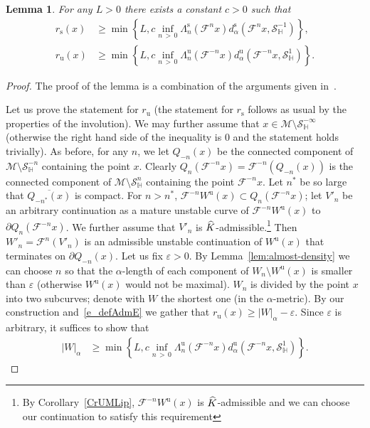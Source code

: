 \documentclass[10pt]{amsart}
\newtheorem{lemm}[theo]{Lemma}\newtheorem{prop}[theo]{Proposition}\newtheorem{coro}[theo]{Corollary}\newtheorem{conj}[theo]{Conjecture}
\theoremstyle{definition}\newtheorem{defi}[theo]{Definition}\newtheorem{rema}[theo]{Remark}\newtheorem{exam}[theo]{Example}\newtheorem{exem}[theo]{Example}\newtheorem{nota}[theo]{Notation}
\newcommand{\eps}{\varepsilon}
\newcommand{\unstable}{\text{u}}
\newcommand{\stable}{\text{s}}
\newcommand{\homo}{\mathbb{H}}
\newcommand{\cm}{\mathcal{F}}
\newcommand{\csp}{\mathcal{M}}
\newcommand{\Wu}{W^{\unstable}}
\newcommand{\dadmPrivate}{d\adm}
\newcommand{\ds}{\dadmPrivate^{\stable}}
\newcommand{\du}{\dadmPrivate^{\unstable}}
\newcommand{\rs}{r_{\stable}}
\newcommand{\ru}{r_{\unstable}}
\newcommand{\singPrivate}{\mathcal{S}}
\newcommand{\hsing}[1]{{\singPrivate}_\homo^{#1}}
\newcommand{\admiss}{admissible}
\newcommand{\adm}{_{\alpha^{+}}}
\newcommand{\admName}{\alpha^{+}}
\renewcommand{\admName}{\alpha}
\renewcommand{\adm}{_{\alpha}}
\let\oldhat\hat
\renewcommand*{\hat}[1]{\mathchoice{\widehat{#1}}{\widehat{#1}}{\oldhat{#1}}{\oldhat{#1}}}
\begin{document}
\begin{lemm} \label{PrSize}
For any $L > 0$ there exists a constant $c > 0$ such that
\begin{align*}
\rs(x)&\geq \min\left\{L,c \inf_{n\, >\,0} \Lambda_{n}^{\stable}\left(\cm^{n}x\right) \ds\left(\cm^{n}x, \hsing{-1}\right)\right\},\\
\ru(x)&\geq \min\left\{L,c \inf_{n\,>\,0} \Lambda_{n}^{\unstable}\left(\cm^{-n}x\right) \du\left(\cm^{-n}x, \hsing{1}\right)\right\}.
\end{align*}
\end{lemm}
\begin{proof}
The proof of the lemma is a combination of the arguments given in~\cite[Lemma~4.67, (4.61), Exercise~5.19 and (5.58)]{ChM}.

Let us prove the statement for $\ru$ (the statement for $\rs$ follows as usual by the properties of the involution). We may further assume that $x\in\csp\setminus\hsing{-\infty}$ (otherwise the right hand side of the inequality is $0$ and the statement holds trivially). As before, for any $n$, we let $Q_{-n}(x)$ be the connected component of $\csp\setminus\hsing{-n}$ containing the point $x$. Clearly $Q_n(\cm^{-n}x) = \cm^{-n}(Q_{-n}(x))$ is the connected component of $\csp\setminus\hsing{n}$ containing the point $\cm^{-n}x$. Let $n^{*}$ be so large that $\overline{Q_{-n^{*}}(x)}$ is compact. For $n > n^{*}$, $\cm^{-n}\Wu(x)\subset Q_{n}(\cm^{-n}x)$; let $V'_{n}$ be an arbitrary continuation as a mature unstable curve of $\cm^{-n}\Wu(x)$ to $\partial Q_{n}(\cm^{-n}x)$. We further assume that $V'_{n}$ is $\hat K$-\admiss{}.\footnote{By Corollary~\ref{CrUMLip}, $\cm^{-n}\Wu(x)$ is $\hat K$-\admiss{} and we can choose our continuation to satisfy this requirement} Then $W'_{n} = \cm^{n}(V'_{n})$ is an admissible unstable continuation of $\Wu(x)$ that terminates on $\partial Q_{-n}(x)$. Let us fix $\eps > 0$. By Lemma~\ref{lem:almost-density} we can choose $n$ so that the $\admName$-length of each component of $W_{n}\setminus \Wu(x)$ is smaller than $\eps$ (otherwise $\Wu(x)$ would not be maximal). $W_{n}$ is divided by the point $x$ into two subcurves; denote with $W$ the shortest one (in the $\admName$-metric). By our construction and~\eqref{e_defAdmE} we gather that $\ru(x)\ge |W|\adm- \eps$. Since $\eps$ is arbitrary, it suffices to show that
\begin{align*}
|W|\adm &\geq \min\left\{L,c \inf_{n\,>\,0} \Lambda_{n}^{\unstable}(\cm^{-n}x) \du\left(\cm^{-n}x, \hsing{1}\right)\right\}.
\end{align*}


\end{proof}
\end{document}
